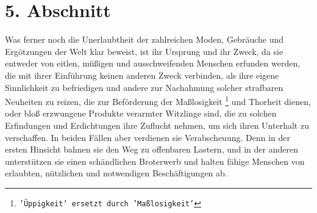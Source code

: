 \section{5. Abschnitt} \label{kap17_ab5}

Was ferner noch die Unerlaubtheit der zahlreichen Moden, Gebräuche und
Ergötzungen der Welt klar beweist, ist ihr Ursprung und ihr Zweck, da sie
entweder von eitlen, müßigen und ausschweifenden Menschen erfunden werden, die
mit ihrer Einführung keinen anderen Zweck verbinden, als ihre eigene Sinnlichkeit
zu befriedigen und andere zur Nachahmung solcher strafbaren Neuheiten zu reizen,
die zur Beförderung der Maßlosigkeit
\footnote{\texttt{'Üppigkeit' ersetzt durch 'Maßlosigkeit'}} und Thorheit dienen,
oder bloß erzwungene
Produkte verarmter Witzlinge sind, die zu solchen Erfindungen und Erdichtungen
ihre Zuflucht nehmen, um sich ihren Unterhalt zu verschaffen. In beiden Fällen
aber verdienen sie Verabscheuung. Denn in der ersten Hinsicht bahnen sie den Weg
zu offenbaren Lastern, und in der anderen unterstützen sie einen schändlichen
Broterwerb und halten fähige Menschen von erlaubten,
nützlichen und
notwendigen Beschäftigungen ab.

\medskip

